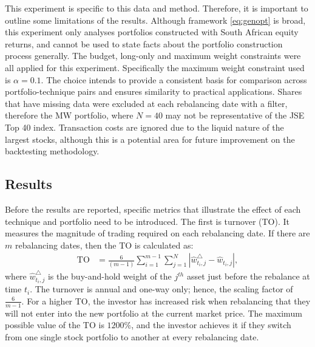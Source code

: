 \documentclass[
]{article}
\begin{document}
This experiment is specific to this data and method. Therefore, it is important to outline some
limitations of the results. Although framework \eqref{eq:genopt} is broad, this experiment only analyses
portfolios constructed with South African equity returns, and cannot be used to state facts about the
portfolio construction process generally. The budget, long-only and maximum weight constraints were all
applied for this experiment. Specifically the maximum weight constraint used is \(\alpha = 0.1\). The
choice intends to provide a consistent basis for comparison across portfolio-technique pairs and
ensures similarity to practical applications. Shares that have missing data were excluded at each
rebalancing date with a filter, therefore the MW portfolio, where \(N = 40\) may not be representative of
the JSE Top 40 index. Transaction costs are ignored due to the liquid nature of the largest stocks,
although this is a potential area for future improvement on the backtesting methodology.

\hypertarget{results}{%
\subsection{Results}\label{results}}

Before the results are reported, specific metrics that illustrate the effect of each technique and
portfolio need to be introduced. The first is turnover (TO). It measures the magnitude of trading
required on each rebalancing date. If there are \(m\) rebalancing dates, then the TO is calculated as:
\begin{align}
\text{TO} & = \frac{6}{(m - 1)} \sum_{i = 1}^{m - 1} \sum_{j =1}^{N} |\hat{w}_{t_i, j}^\triangle - \hat{w}_{t_i, j}|,
\end{align}
where \(\hat{w}_{t_i, j}^\triangle\) is the buy-and-hold weight of the \(j^{th}\) asset just before the
rebalance at time \(t_i\). The turnover is annual and one-way only; hence, the scaling factor of
\(\frac{6}{m-1}\). For a higher TO, the investor has increased risk when rebalancing that they will not
enter into the new portfolio at the current market price. The maximum possible value of the TO is
\(1200\%\), and the investor achieves it if they switch from one single stock portfolio to another at
every rebalancing date.
\end{document}
